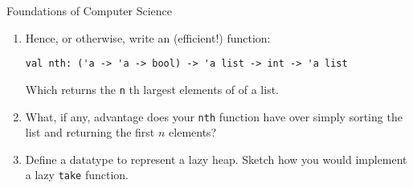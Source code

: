 \documentclass{tripos}  %
\begin{document}
\begin{question}[MockIA,year=2024,paper=1,question=2,author=rrw]{Foundations of Computer Science}
\begin{enumerate}
\item Hence, or otherwise, write an (efficient!) function:

\begin{verbatim}
val nth: ('a -> 'a -> bool) -> 'a list -> int -> 'a list
\end{verbatim}

Which returns the \verb|n| th largest elements of of a list.

\item What, if any, advantage does your \verb|nth| function have over simply sorting the list and returning the first $n$ elements?
\item Define a datatype to represent a lazy heap. Sketch how you would implement a lazy \verb|take| function.
\end{enumerate}

\end{question}
\end{document}
